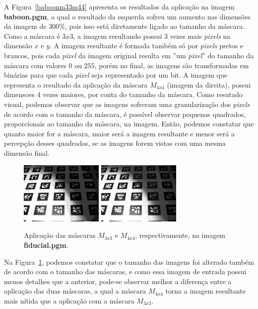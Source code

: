 \documentclass[twoside,twocolumn]{article}
\begin{document}
A Figura~\ref{baboonm33m44} apresenta os resultados da aplicação na imagem \textbf{baboon.pgm}, o qual o resultado da esquerda sofreu um aumento nas dimensões da imagem de $300\%$, pois isso está diretamente ligado ao tamanho da máscara. Como a máscara é $3x3$, a imagem resultando possui $3$ vezes mais \textit{pixels} na dimensão $x$ e $y$. A imagem resultante é formada também só por \textit{pixels} pretos e brancos, pois cada \textit{pixel} da imagem original resulta em ''um \textit{pixel}'' do tamanho da máscara com valores $0$ ou $255$, porém no final, as imagens são transformadas em binárias para que cada \textit{pixel} seja representado por um bit. A imagem que representa o resultado da aplicação da máscara $M_{4x4}$ (imagem da direita), possui dimensoes $4$ vezes maiores, por conta do tamanho da máscara. Como resutado visual, podemos observar que as imagens sofreram uma granularização dos \textit{pixels} de acordo com o tamanho da máscara, é possível observar pequenos quadrados, proporcionais ao tamanho da máscara, na imagem. Então, podemos constatar que quanto maior for a máscara, maior será a imagem resultante e menor será a percepção desses quadrados, se as imagens forem vistas com uma mesma dimensão final.

\begin{figure}[H]
\begin{center}
	\includegraphics[height=3cm]{figures/fiducial_m33.png}
	\includegraphics[height=3cm]{figures/fiducial_m44.png}
\caption{Aplicação das máscaras $M_{3x3}$ e $M_{4x4}$, respectivamente, na imagem \textbf{fiducial.pgm}.} \label{fiducialm33m44}
\end{center}
\end{figure}

Na Figura~\ref{fiducialm33m44}, podemos constatar que o tamanho das imagens foi alterado também de acordo com o tamanho das máscaras, e como essa imagem de entrada possui menos detalhes que a anterior, pode-se observar melhor a diferença entre a aplicação das duas máscaras, a qual a máscara $M_{4x4}$ torna a imagem resultante mais nítida que a aplicação com a máscara $M_{3x3}$.
\end{document}
